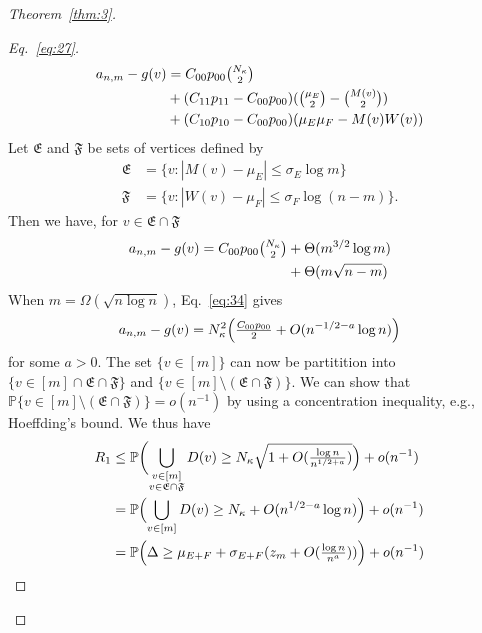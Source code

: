 \documentclass[draftcls]{IEEEtran}
\theoremstyle{definition}
\begin{document}
\begin{proof}[Theorem~\ref{thm:3}]
\begin{proof}[Eq.~\eqref{eq:27}]
\begin{equation*}
  \begin{split}
  a_{n,m} - g(v) &= C_{00} p_{00} \tbinom{N_\kappa}{2} \\ &+ (C_{11}p_{11} -
  C_{00} p_{00})(\tbinom{\mu_E}{2} - \tbinom{M(v)}{2})
  \\ &+ (C_{10} p_{10} - C_{00} p_{00})(\mu_E\mu_F - M(v)W(v))
  \end{split}
\end{equation*}
Let $\mathfrak{E}$ and $\mathfrak{F}$ be sets of vertices defined by
\begin{align}
\mathfrak{E} &=
\{v \colon |M(v) - \mu_E| \leq \sigma_E \log{m}\} \\ \mathfrak{F} &=
\{v \colon |W(v) - \mu_F| \leq \sigma_F \log{(n-m)}\}.
\end{align}
Then we have, for $v \in \mathfrak{E} \cap \mathfrak{F}$
\begin{equation}
  \label{eq:34}
  \begin{split}
  a_{n,m} - g(v) =  C_{00} p_{00} \tbinom{N_\kappa}{2} &+
  \Theta(m^{3/2} \log{m}) \\ &+ 
  \Theta(m \sqrt{n - m}) \\
  \end{split}
\end{equation}
When $m = \Omega(\sqrt{n \log n})$, Eq.~\eqref{eq:34} gives
\begin{equation}
  \label{eq:35}
  a_{n,m} - g(v) = N_{\kappa}^{2}\Bigl(\tfrac{C_{00}p_{00}}{2} + O(n^{-1/2 - a}
  \log{n})\Bigr)
\end{equation}
for some $a > 0$. The set $\{v \in [m]\}$ can now be partitition into
$\{v \in [m] \cap \mathfrak{E} \cap\mathfrak{F}\}$ and $\{v \in [m]
\setminus (\mathfrak{E} \cap \mathfrak{F})\}$. We can show that
$\mathbb{P}\{v \in [m] \setminus (\mathfrak{E} \cap \mathfrak{F})\} =
o(n^{-1})$ by using a concentration inequality, e.g., Hoeffding's
bound. We thus have
\begin{equation}
  \label{eq:37}
  \begin{split}
    R_1 &\leq \mathbb{P}\biggl( \bigcup_{\substack{v \in [m] \\ v
        \in \mathfrak{E} \cap \mathfrak{F}}} D(v) \geq
    N_{\kappa} \sqrt{1 + O(\tfrac{\log{n}}{n^{1/2+a}})} \Bigr) + o(n^{-1}) \\
    & = \mathbb{P}\Bigl(\bigcup_{v \in [m]} D(v) \geq N_\kappa +
    O(n^{1/2 - a} \log{n})\Bigr) + o(n^{-1}) \\
    &= \mathbb{P}\Bigl(\Delta \geq \mu_{E+F} +
    \sigma_{E+F}(z_m + O(\tfrac{\log{n}}{n^{a}}))\Bigr) + o(n^{-1}) \\ 

\end{split}
\end{equation}
\end{proof}
\end{proof}
\end{document}
